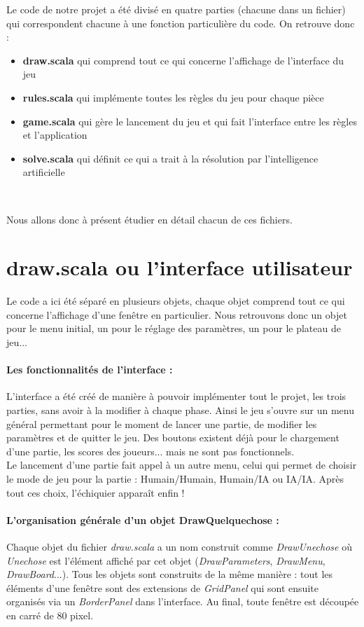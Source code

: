 \documentclass[a4paper]{article}
\begin{document}
Le code de notre projet a été divisé en quatre parties (chacune dans un fichier) qui correspondent chacune à une fonction particulière du code. On retrouve donc :
\begin{itemize}
\item \textbf{draw.scala} qui comprend tout ce qui concerne l'affichage de l'interface du jeu
\item \textbf{rules.scala} qui implémente toutes les règles du jeu pour chaque pièce
\item \textbf{game.scala} qui gère le lancement du jeu et qui fait l'interface entre les règles et l'application
\item \textbf{solve.scala} qui définit ce qui a trait à la résolution par l'intelligence artificielle
\end{itemize}~

Nous allons donc à présent étudier en détail chacun de ces fichiers.

\section{draw.scala ou l'interface utilisateur}

Le code a ici été séparé en plusieurs objets, chaque objet comprend tout ce qui concerne l'affichage d'une fenêtre en particulier. Nous retrouvons donc un objet pour le menu initial, un pour le réglage des paramètres, un pour le plateau de jeu...

\paragraph{Les fonctionnalités de l'interface :}L'interface a été créé de manière à pouvoir implémenter tout le projet, les trois parties, sans avoir à la modifier à chaque phase. Ainsi le jeu s'ouvre sur un menu général permettant pour le moment de lancer une partie, de modifier les paramètres et de quitter le jeu. Des boutons existent déjà pour le chargement d'une partie, les scores des joueurs... mais ne sont pas fonctionnels. \\

Le lancement d'une partie fait appel à un autre menu, celui qui permet de choisir le mode de jeu pour la partie : Humain/Humain, Humain/IA ou IA/IA. Après tout ces choix, l'échiquier apparaît enfin !

\paragraph{L'organisation générale d'un objet DrawQuelquechose :}Chaque objet du fichier \textit{draw.scala} a un nom construit comme \textit{DrawUnechose} où \textit{Unechose} est l'élément affiché par cet objet (\textit{DrawParameters}, \textit{DrawMenu}, \textit{DrawBoard}...). Tous les objets sont construits de la même manière : tout les éléments d'une fenêtre sont des extensions de \textit{GridPanel} qui sont ensuite organisés via un \textit{BorderPanel} dans l'interface. Au final, toute fenêtre est découpée en carré de 80 pixel. \\
\end{document}
